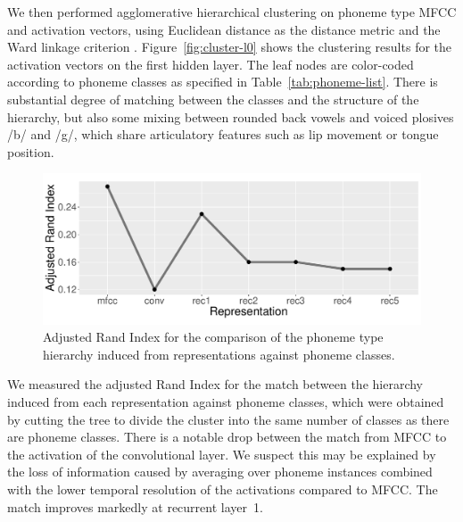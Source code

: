 We then performed agglomerative hierarchical clustering on phoneme type MFCC and 
activation vectors, using Euclidean distance as the distance metric and the Ward linkage criterion \citep{ward1963hierarchical}.
Figure~\ref{fig:cluster-l0} shows the clustering results for the activation vectors
on the first hidden layer. The leaf nodes are color-coded according to phoneme classes as specified in Table~\ref{tab:phoneme-list}. There is substantial degree of matching between the classes and the structure of the hierarchy, but also some mixing between rounded back vowels and voiced plosives /b/ and /g/, which share articulatory features such as lip movement or tongue position. 
\begin{figure}[ht]
  \centering
  \includegraphics[scale=0.3]{figures/hier_ari.pdf}
  \caption{Adjusted Rand Index for the comparison of the phoneme type hierarchy induced from representations against phoneme classes.}
  \label{fig:hier_ari}
\end{figure}

We measured the adjusted Rand Index for the match between the
hierarchy induced from each representation against phoneme classes,
which were obtained by cutting the tree to divide the cluster into the
same number of classes as there are phoneme classes. There is a notable drop between the match from MFCC to the activation of the convolutional layer. We suspect this may be explained by the loss of information caused by averaging over phoneme instances combined with the lower temporal resolution of the activations compared to MFCC. The match improves markedly at recurrent layer~1.


